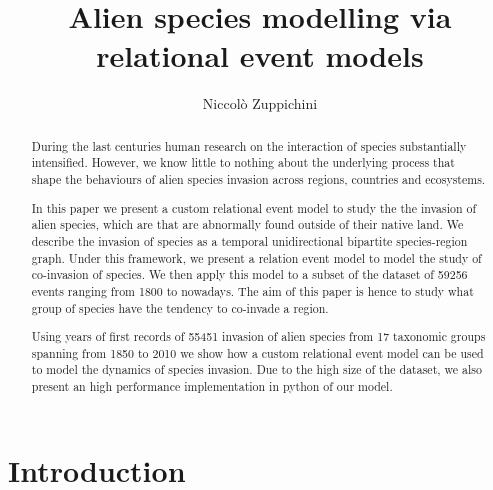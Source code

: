 \documentclass[mscthesis]{usiinfthesis}
\title{Alien species modelling via relational event models} %
\author{Niccol\`o Zuppichini} %
\newcommand\numberevents{59256 }
\begin{document}
\maketitle %
\frontmatter %

\begin{abstract}
During the last centuries human research on the interaction of species substantially intensified. However, we know little to nothing about the underlying process that shape the behaviours of alien species invasion across regions, countries and ecosystems.

In this paper we present a custom relational event model to study the the invasion of alien species, which are that are abnormally found outside of their native land. We describe the invasion of species as a temporal unidirectional bipartite species-region graph. Under this framework, we present a relation event model to model the study of co-invasion of species. We then apply this model to a subset of the dataset of \numberevents events ranging from 1800 to nowadays. The aim of this paper is hence to study what group of species have the tendency to co-invade a region.

Using years of first records of 55451 invasion of alien species from 17 taxonomic groups spanning from 1850 to 2010 we show how a custom relational event model can be used to model the dynamics of species invasion. Due to the high size of the dataset, we also present an high performance implementation in python of our model.

\end{abstract}



\mainmatter

\chapter{Introduction}
\end{document}
